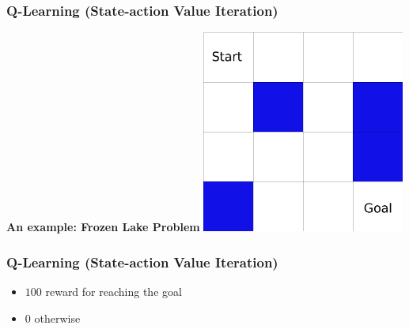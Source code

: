 \begin{frame}
\frametitle{Q-Learning (State-action Value Iteration)}
  \begin{center}
  \textbf{An example: Frozen Lake Problem}
  \includegraphics[width=0.5\textwidth]{frozen-lake.png}
  \end{center}

\end{frame}
\begin{frame}
\frametitle{Q-Learning (State-action Value Iteration)}
  \begin{itemize}
    \item $100$ reward for reaching the goal
    \item $0$ otherwise
  \end{itemize}
\end{frame}
